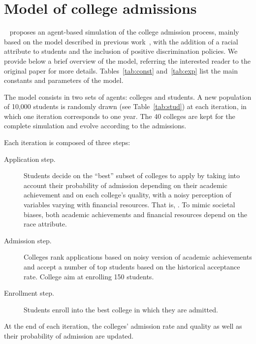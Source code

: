 \section{Model of college admissions}

\citeauthor{reardon2018levels}~\cite{reardon2018levels} proposes an agent-based simulation of the college admission process, mainly based on the model described in previous work~\cite{reardon2016agent}, with the addition of a racial attribute to students and the inclusion of positive discrimination policies.
We provide below a brief overview of the model, referring the interested reader to the original paper for more details. Tables~\ref{tab:const} and~\ref{tab:exp} list the main constants and parameters of the model.

The model consists in two sets of agents: colleges and students.
A new population of 10,000 students is randomly drawn (see Table~\ref{tab:stud}) at each iteration, in which one iteration corresponds to one year.
The 40 colleges are kept for the complete simulation and evolve according to the admissions.

Each iteration is composed of three steps:

\begin{description}

\item[Application step.] Students decide on the ``best'' subset of colleges to apply by taking into account their probability of admission depending on their academic achievement and on each college's quality, with a noisy perception of variables varying with financial resources. That is, .
To mimic societal biases, both academic achievements and financial resources depend on the race attribute.

\item[Admission step.] Colleges rank applications based on noisy version of academic achievements and accept a number of top students based on the historical acceptance rate. College aim at enrolling 150 students.

\item[Enrollment step.] Students enroll into the best college in which they are admitted.

\end{description}

At the end of each iteration, the colleges' admission rate and quality as well as their probability of admission are updated.

